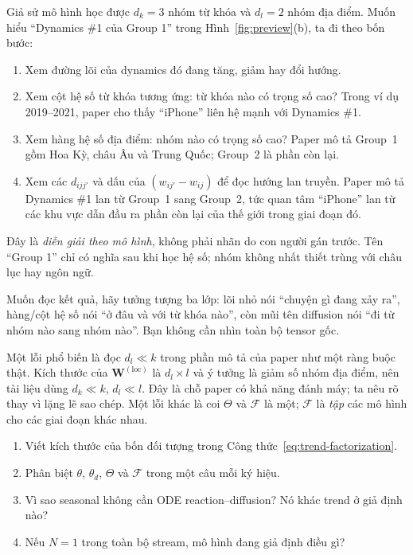 Giả sử mô hình học được $d_k=3$ nhóm từ khóa và $d_l=2$ nhóm địa điểm. Muốn hiểu ``Dynamics \#1
của Group 1'' trong Hình~\ref{fig:preview}(b), ta đi theo bốn bước:
\begin{enumerate}
  \item Xem đường lõi của dynamics đó đang tăng, giảm hay đổi hướng.
  \item Xem cột hệ số từ khóa tương ứng: từ khóa nào có trọng số cao? Trong ví dụ 2019--2021,
        paper cho thấy ``iPhone'' liên hệ mạnh với Dynamics \#1.
  \item Xem hàng hệ số địa điểm: nhóm nào có trọng số cao? Paper mô tả Group~1 gồm Hoa Kỳ, châu
        Âu và Trung Quốc; Group~2 là phần còn lại.
  \item Xem các $d_{ijj'}$ và dấu của $(w_{ij'}-w_{ij})$ để đọc hướng lan truyền. Paper mô tả
        Dynamics \#1 lan từ Group~1 sang Group~2, tức quan tâm ``iPhone'' lan từ các khu vực dẫn
        đầu ra phần còn lại của thế giới trong giai đoạn đó.
\end{enumerate}
Đây là \emph{diễn giải theo mô hình}, không phải nhãn do con người gán trước. Tên ``Group 1'' chỉ
có nghĩa sau khi học hệ số; nhóm không nhất thiết trùng với châu lục hay ngôn ngữ.

\begin{plainwords}
Muốn đọc kết quả, hãy tưởng tượng ba lớp: lõi nhỏ nói ``chuyện gì đang xảy ra'', hàng/cột hệ số
nói ``ở đâu và với từ khóa nào'', còn mũi tên diffusion nói ``đi từ nhóm nào sang nhóm nào''.
Bạn không cần nhìn toàn bộ tensor gốc.
\end{plainwords}

\begin{commonmistake}
Một lỗi phổ biến là đọc $d_l\ll k$ trong phần mô tả của paper như một ràng buộc thật. Kích thước
của $\mathbf{W}^{(\mathrm{loc})}$ là $d_l\times l$ và ý tưởng là giảm số nhóm địa điểm, nên tài
liệu dùng $d_k\ll k$, $d_l\ll l$. Đây là chỗ paper có khả năng đánh máy; ta nêu rõ thay vì lặng lẽ
sao chép. Một lỗi khác là coi $\Theta$ và $\mathcal{F}$ là một; $\mathcal{F}$ là \emph{tập} các
mô hình cho các giai đoạn khác nhau.
\end{commonmistake}

\begin{selfcheck}
\begin{enumerate}
  \item Viết kích thước của bốn đối tượng trong Công thức~\eqref{eq:trend-factorization}.
  \item Phân biệt $\theta$, $\theta_d$, $\Theta$ và $\mathcal{F}$ trong một câu mỗi ký hiệu.
  \item Vì sao seasonal không cần ODE reaction--diffusion? Nó khác trend ở giả định nào?
  \item Nếu $N=1$ trong toàn bộ stream, mô hình đang giả định điều gì?
\end{enumerate}
\end{selfcheck}

